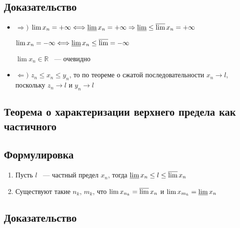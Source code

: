 \documentclass[../main.tex]{subfiles}
\begin{document}
        \subsection*{Доказательство}
        
            \begin{itemize}
            
                \item $\Rightarrow)$ $\lim x_n = +\infty \Longleftrightarrow \varliminf x_n = +\infty \Rightarrow \varliminf \leq \varlimsup x_n = +\infty$
                
                    $\lim x_n = -\infty \Longleftrightarrow \varliminf x_n \leq \varlimsup = -\infty$
                    
                    $\lim x_n \in \mathbb{R}$ ~--- очевидно
                    
                \item $\Leftarrow)$ $z_n \leq x_n \leq y_n$, то по теореме о сжатой последовательности $x_n \rightarrow l$, поскольку $z_n \rightarrow l$ и $y_n \rightarrow l$
                
            \end{itemize}
\newpage


\subsection{Теорема о характеризации верхнего предела как частичного}
\subsection*{Формулировка}
            
            \begin{enumerate}
            
                \item Пусть $l$ ~--- частный предел $x_n$, тогда $\varliminf x_n \leq l \leq \varlimsup x_n$
                
                \item Существуют такие $n_k$, $m_k$, что $\lim x_{n_k} = \varlimsup x_n$ и $\lim x_{m_k} = \varliminf x_n$
                
            \end{enumerate}
            
        \subsection*{Доказательство}
        
\end{document}
